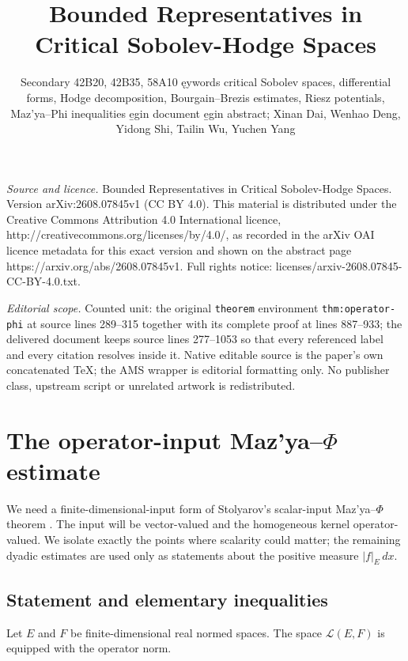 \documentclass[10pt,a4paper]{amsart}
\numberwithin{equation}{section}
\newcommand{\cL}{\mathcal L}
\begin{document}
\title[Bounded Representatives in Critical Sobolev-Hodge Spaces]{Bounded Representatives in Critical Sobolev-Hodge Spaces}
\author{Secondary 42B20, 42B35, 58A10 ęywords critical Sobolev spaces, differential forms, Hodge decomposition, Bourgain--Brezis estimates, Riesz potentials, Maz'ya--Phi inequalities e̱gin document e̱gin abstract; Xinan Dai, Wenhao Deng, Yidong Shi, Tailin Wu, Yuchen Yang}
\date{}
\maketitle
\noindent\emph{Source and licence.} Bounded Representatives in Critical Sobolev-Hodge Spaces. Version arXiv:2608.07845v1 (CC BY 4.0). This material is distributed under the Creative Commons Attribution 4.0 International licence, http://creativecommons.org/licenses/by/4.0/, as recorded in the arXiv OAI licence metadata for this exact version and shown on the abstract page https://arxiv.org/abs/2608.07845v1. Full rights notice: licenses/arxiv-2608.07845-CC-BY-4.0.txt.\par\smallskip
\noindent\textit{Editorial scope.} Counted unit: the original \texttt{theorem} environment \texttt{thm:operator-phi} at source lines 289--315 together with its complete proof at lines 887--933; the delivered document keeps source lines 277--1053 so that every referenced label and every citation resolves inside it. Native editable source is the paper's own concatenated TeX; the AMS wrapper is editorial formatting only. No publisher class, upstream script or unrelated artwork is redistributed.
\section{The operator-input Maz'ya--\texorpdfstring{$\Phi$}{Phi} estimate}\label{sec:mazya}

We need a finite-dimensional-input form of Stolyarov's scalar-input
Maz'ya--$\Phi$ theorem \cite[Theorem~2.1]{Stolyarov24}.  The input will be
vector-valued and the homogeneous kernel operator-valued.  We isolate exactly
the points where scalarity could matter; the remaining dyadic estimates are
used only as statements about the positive measure $|f|_E\,dx$.

\subsection{Statement and elementary inequalities}
Let $E$ and $F$ be finite-dimensional real normed spaces.  The space
$\cL(E,F)$ is equipped with the operator norm.
\end{document}
